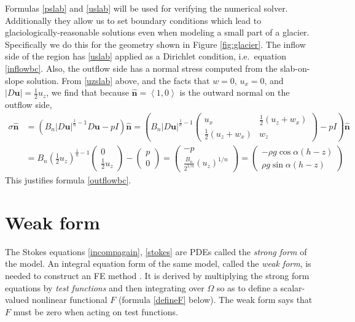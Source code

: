 \documentclass[letterpaper,final,12pt,reqno]{amsart}
\newcommand{\hbn}{\hat{\mathbf{n}}}
\newcommand{\bu}{\mathbf{u}}
\begin{document}
Formulas \eqref{pslab} and \eqref{uslab} will be used for verifying the numerical solver.  Additionally they allow us to set boundary conditions which lead to glaciologically-reasonable solutions even when modeling a small part of a glacier.  Specifically we do this for the geometry shown in Figure \ref{fig:glacier}.  The inflow side of the region has \eqref{uslab} applied as a Dirichlet condition, i.e.~equation \eqref{inflowbc}.  Also, the outflow side has a normal stress computed from the slab-on-slope solution.  From \eqref{uzslab} above, and the facts that $w=0$, $u_x=0$, and $|D\bu| = \frac{1}{2} u_z$, we find that because $\hbn=\left<1,0\right>$ is the outward normal on the outflow side,
\begin{align*}
\sigma \hbn &= \left(B_n |D\bu|^{\frac{1}{n}-1} D\bu - pI\right)\hbn = \left(B_n |D\bu|^{\frac{1}{n}-1} \begin{pmatrix} u_x & \frac{1}{2}(u_z+w_x) \\ \frac{1}{2}(u_z+w_x) & w_z \end{pmatrix} - pI\right)\hbn \\
    &= B_n \left(\frac{1}{2} u_z\right)^{\frac{1}{n}-1} \begin{pmatrix} 0 \\ \frac{1}{2} u_z \end{pmatrix} - \begin{pmatrix} p \\ 0 \end{pmatrix} = \begin{pmatrix} - p \\ \frac{B_n}{2^{1/n}} (u_z)^{1/n} \end{pmatrix} = \begin{pmatrix} - \rho g\cos\alpha (h-z) \\ \rho g\sin\alpha (h-z) \end{pmatrix}
\end{align*}
This justifies formula \eqref{outflowbc}.


\section{Weak form} \label{sec:weakform}

The Stokes equations \eqref{incompagain}, \eqref{stokes} are PDEs called the \emph{strong form} of the model.  An integral equation form of the same model, called the \emph{weak form}, is needed to construct an FE method \cite{Elmanetal2014}.  It is derived by multiplying the strong form equations by \emph{test functions} and then integrating over $\Omega$ so as to define a scalar-valued nonlinear functional $F$ (formula \eqref{defineF} below).  The weak form says that $F$ must be zero when acting on test functions.
\end{document}
